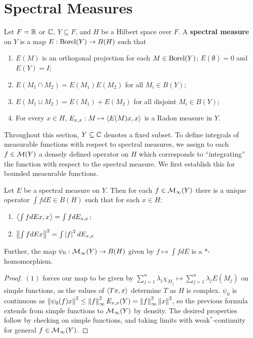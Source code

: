 \documentclass[10pt]{amsart}
\begin{document}
\section{Spectral Measures}
\begin{definition}
    Let $F = \mathbb{R}$ or $\mathbb{C}$, $Y \subseteq F$, and $H$ be a Hilbert space over $F$. A \textbf{spectral measure} on $Y$ is a map $E : \operatorname{Borel}(Y) \to B(H)$ such that
    \begin{enumerate}
        \item $E(M)$ is an orthogonal projection for each $M \in \operatorname{Borel}(Y)$; $E(\emptyset) = 0$ and $E(Y) = I$;
        \item $E(M_1 \cap M_2) = E(M_1)E(M_2)$ for all $M_i \in B(Y)$;
        \item $E(M_1 \sqcup M_2) = E(M_1) + E(M_2)$ for all disjoint $M_i \in B(Y)$;
        \item For every $x \in H$, $E_{x, x} : M \mapsto \left\langle E(M)x, x \right\rangle$ is a Radon measure in $Y$.
    \end{enumerate}
\end{definition}
Throughout this section, $Y \subseteq \mathbb{C}$ denotes a fixed subset. To define integrals of measurable functions with respect to spectral measures, we assign to each $f \in \mathcal{M}(Y)$ a densely defined operator on $H$ which corresponds to ``integrating'' the function with respect to the spectral measure. We first establish this for bounded measurable functions.
\begin{lemma}\label{bdint}
    Let $E$ be a spectral measure on $Y$. Then for each $f \in \mathcal{M}_\infty(Y)$ there is a unique operator $\int f dE \in B(H)$ such that for each $x \in H$:
    \begin{enumerate}
        \item $\left\langle \int f dEx, x \right\rangle = \int f dE_{x, x}$;
        \item $\left\| \int f dE x \right\|^2 = \int\left| f \right|^2 dE_{x, x}$
    \end{enumerate}
    Further, the map $\psi_0 : \mathcal{M}_\infty(Y) \to B(H)$ given by $f \mapsto \int f dE$ is a $*$-homomorphism.
\end{lemma}
\begin{proof}
    $(1)$ forces our map to be given by $\sum_{j = 1}^n \lambda_j \chi_{M_j} \mapsto \sum_{j = 1}^n \lambda_j E(M_j)$ on simple functions, as the values of $\left\langle Tx, x \right\rangle$ determine $T$ as $H$ is complex. $\psi_0$ is continuous as $\left\| \psi_0(f)x \right\|^2 \leq \left\| f \right\|^2_\infty E_{x, x}(Y) = \left\| f \right\|_\infty^2\left\| x \right\|^2$, so the previous formula extends from simple functions to $\mathcal{M}_\infty(Y)$ by density. The desired properties follow by checking on simple functions, and taking limits with weak$^*$-continuity for general $f \in \mathcal{M}_\infty(Y)$.
\end{proof}
\end{document}
